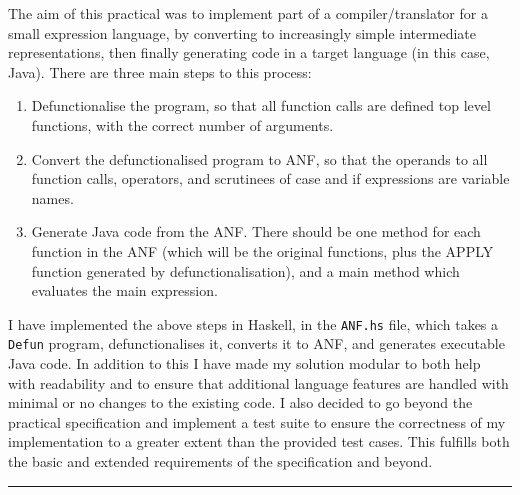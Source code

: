 \label{chapter:overview}

The aim of this practical was to implement part of a compiler/translator for a small
expression language, by converting to increasingly simple intermediate representations, then finally
generating code in a target language (in this case, Java). There are three main steps to this process:
\begin{enumerate}
	\item Defunctionalise the program, so that all function calls are defined top
	      level functions, with the correct number of arguments.
	\item Convert the defunctionalised program to ANF, so that the operands to all
	      function calls, operators, and scrutinees of case and if expressions are
	      variable names.
	\item Generate Java code from the ANF. There should be one method for each
	      function in the ANF (which will be the original functions, plus the APPLY
	      function generated by defunctionalisation), and a main method which
	      evaluates the main expression.
\end{enumerate}

I have implemented the above steps in Haskell, in the \texttt{ANF.hs} file,
which takes a \texttt{Defun} program, defunctionalises it, converts it to ANF, and generates
executable Java code. In addition to this I have made my solution modular to
both help with readability and to ensure that additional language features are
handled with minimal or no changes to the existing code. I also decided to go
beyond the practical specification and implement a test suite to ensure the
correctness of my implementation to a greater extent than the provided test
cases. This fulfills both the basic and extended requirements of the
specification and beyond.

\begin{center}
	\noindent\rule{8cm}{0.4pt}
\end{center}



